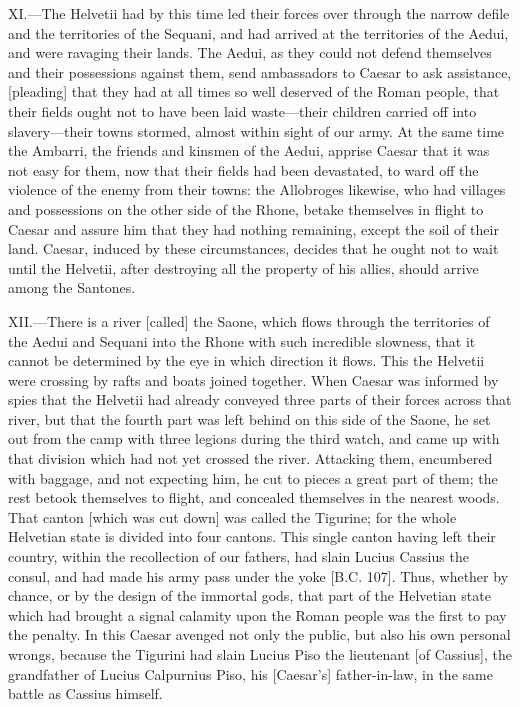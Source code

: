XI.—The Helvetii had by this time led their forces over through the
narrow defile and the territories of the Sequani, and had arrived at the
territories of the Aedui, and were ravaging their lands. The Aedui, as
they could not defend themselves and their possessions against them,
send ambassadors to Caesar to ask assistance, [pleading] that they had
at all times so well deserved of the Roman people, that their fields
ought not to have been laid waste—their children carried off into
slavery—their towns stormed, almost within sight of our army. At the
same time the Ambarri, the friends and kinsmen of the Aedui, apprise
Caesar that it was not easy for them, now that their fields had been
devastated, to ward off the violence of the enemy from their towns: the
Allobroges likewise, who had villages and possessions on the other side
of the Rhone, betake themselves in flight to Caesar and assure him that
they had nothing remaining, except the soil of their land. Caesar,
induced by these circumstances, decides that he ought not to wait until
the Helvetii, after destroying all the property of his allies, should
arrive among the Santones.

XII.—There is a river [called] the Saone, which flows through the
territories of the Aedui and Sequani into the Rhone with such incredible
slowness, that it cannot be determined by the eye in which direction it
flows. This the Helvetii were crossing by rafts and boats joined
together. When Caesar was informed by spies that the Helvetii had
already conveyed three parts of their forces across that river, but that
the fourth part was left behind on this side of the Saone, he set out
from the camp with three legions during the third watch, and came up
with that division which had not yet crossed the river. Attacking them,
encumbered with baggage, and not expecting him, he cut to pieces a great
part of them; the rest betook themselves to flight, and concealed
themselves in the nearest woods. That canton [which was cut down] was
called the Tigurine; for the whole Helvetian state is divided into four
cantons. This single canton having left their country, within the
recollection of our fathers, had slain Lucius Cassius the consul, and
had made his army pass under the yoke [B.C. 107]. Thus, whether by
chance, or by the design of the immortal gods, that part of the
Helvetian state which had brought a signal calamity upon the Roman
people was the first to pay the penalty. In this Caesar avenged not only
the public, but also his own personal wrongs, because the Tigurini had
slain Lucius Piso the lieutenant [of Cassius], the grandfather of Lucius
Calpurnius Piso, his [Caesar's] father-in-law, in the same battle as
Cassius himself.

